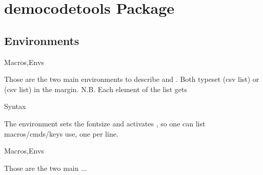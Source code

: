 \documentclass[dctools,english]{ufrgscca}
\begin{document}
\section{democodetools Package}




\subsection{Environments}
\begin{Envs}{Macros,Envs}
\begin{Syntax}%
\end{Syntax}
Those are the two main environments to describe  and . Both typeset  (csv list) or  (csv list) in the margin. N.B. Each element of the list gets \Macro{\detokenize}{}
\end{Envs}

\begin{Envs}{Syntax}
\begin{Syntax}%
\Macro{\begin{Syntax}}{}
\end{Syntax}
The  environment sets the fontsize and activates \Macro{\obeylines}{}, so one can list macros/cmds/keys use, one per line.

\begin{stcode}[st=demoD]
\begin{Envs}{Macros,Envs}
\begin{Syntax}%
\end{Syntax}
Those are the two main ...
\end{Envs}
\end{stcode}

\end{Envs}
\end{document}
